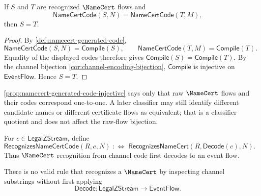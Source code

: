\begin{proposition}
\label{prop:namecert-generated-code-injective}
If $S$ and $T$ are recognized $\NameCert$ flows and
$$
  \mathsf{NameCertCode}(S,N)
  =
  \mathsf{NameCertCode}(T,M),
$$
then $S=T$.
\end{proposition}

\begin{proof}
By \autoref{def:namecert-generated-code},
$$
  \mathsf{NameCertCode}(S,N)=\mathsf{Compile}(S),
  \qquad
  \mathsf{NameCertCode}(T,M)=\mathsf{Compile}(T).
$$
Equality of the displayed codes therefore gives $\mathsf{Compile}(S)=\mathsf{Compile}(T)$. By the channel bijection \autoref{cor:channel-encoding-bijection}, $\mathsf{Compile}$ is injective on $\mathsf{EventFlow}$. Hence $S=T$.
\end{proof}

\begin{remark}
\label{rem:namecert-generated-names-may-classify-together}
\autoref{prop:namecert-generated-code-injective} says only that raw $\NameCert$ flows and their codes correspond one-to-one. A later classifier may still identify different candidate names or different certificate flows as equivalent; that is a classifier quotient and does not affect the raw-flow bijection.
\end{remark}

\begin{definition}
\label{def:namecert-generated-recognition-from-code}
For $c \in \mathsf{LegalZStream}$, define
$$
  \mathsf{RecognizesNameCertCode}(R,c,N)
  \;:\Longleftrightarrow\;
  \mathsf{RecognizesNameCert}(R,\mathsf{Decode}(c),N).
$$
Thus $\NameCert$ recognition from channel code first decodes to an event flow.
\end{definition}

\begin{proposition}
\label{prop:namecert-generated-no-recognition-by-channel-substring}
There is no valid rule that recognizes a $\NameCert$ by inspecting channel substrings without first applying
$$
  \mathsf{Decode}\colon \mathsf{LegalZStream}\to\mathsf{EventFlow}.
$$
\end{proposition}

